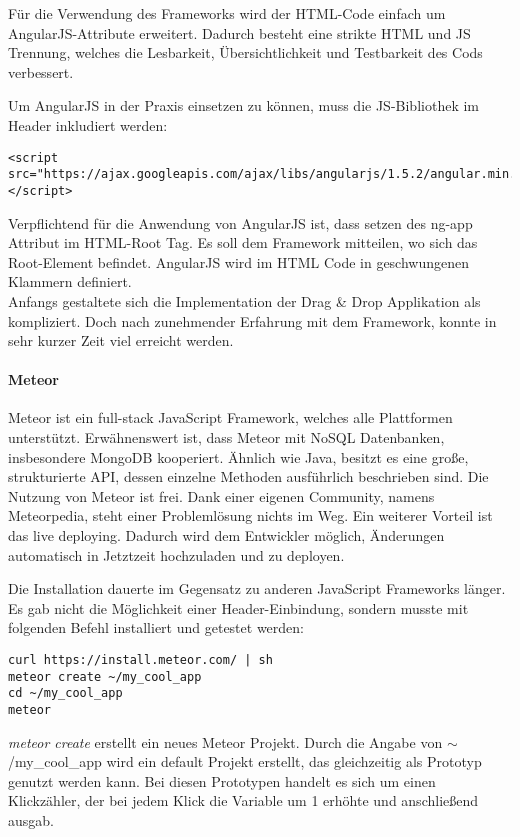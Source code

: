 Für die Verwendung des Frameworks wird der HTML-Code einfach um AngularJS-Attribute erweitert. Dadurch besteht eine strikte HTML und JS Trennung, welches die Lesbarkeit, Übersichtlichkeit und Testbarkeit des Cods verbessert. \cite{ANGULARJS}

Um AngularJS in der Praxis einsetzen zu können, muss die JS-Bibliothek im Header inkludiert werden: 
\begin{lstlisting}[caption={AngularJS einbinden\cite{ANGULARJSDOWN}}]
<script 
src="https://ajax.googleapis.com/ajax/libs/angularjs/1.5.2/angular.min.js">
</script>
\end{lstlisting}

Verpflichtend für die Anwendung von AngularJS ist, dass setzen des ng-app Attribut im HTML-Root Tag. Es soll dem Framework mitteilen, wo sich das Root-Element befindet. AngularJS wird im HTML Code in geschwungenen Klammern definiert.\\
Anfangs gestaltete sich die Implementation der Drag \& Drop Applikation als kompliziert. Doch nach zunehmender Erfahrung mit dem Framework, konnte in sehr kurzer Zeit viel erreicht werden.

\paragraph{Meteor}
Meteor ist ein full-stack JavaScript Framework, welches alle Plattformen unterstützt. Erwähnenswert ist, dass Meteor mit NoSQL Datenbanken, insbesondere MongoDB kooperiert. Ähnlich wie Java, besitzt es eine große, strukturierte API, dessen einzelne Methoden ausführlich beschrieben sind. Die Nutzung von Meteor ist frei. Dank einer eigenen Community, namens Meteorpedia, steht einer Problemlösung nichts im Weg. Ein weiterer Vorteil ist das live deploying. Dadurch wird dem Entwickler möglich, Änderungen automatisch in Jetztzeit hochzuladen und zu deployen. \cite{METEOR}

\newpage

Die Installation dauerte im Gegensatz zu anderen JavaScript Frameworks länger. Es gab nicht die Möglichkeit einer Header-Einbindung, sondern musste mit folgenden Befehl installiert und getestet werden:
\begin{lstlisting}[caption={Installation von Meteor \cite{METEORINSTALL}}]
curl https://install.meteor.com/ | sh
meteor create ~/my_cool_app
cd ~/my_cool_app
meteor
\end{lstlisting}

\textit{meteor create} erstellt ein neues Meteor Projekt. Durch die Angabe von $\sim$/my\_cool\_app wird ein default Projekt erstellt, das gleichzeitig als Prototyp genutzt werden kann. Bei diesen Prototypen handelt es sich um einen Klickzähler, der bei jedem Klick die Variable um 1 erhöhte und anschließend ausgab.

